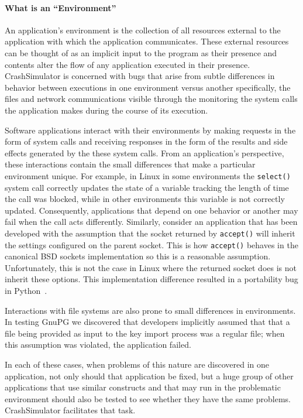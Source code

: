 \paragraph{What is an ``Environment''}

An application's environment is the collection of all resources external to the application with which the
application communicates.  These external resources can be thought of as an implicit input to the program as their
presence and contents alter the flow of any application executed in their presence. CrashSimulator is concerned with
bugs that arise from subtle differences in behavior between executions in one environment versus another
specifically, the files and network communications visible through the monitoring the system calls the application
makes during the course of its execution.

Software applications interact with their environments by making requests in the form of system calls and receiving
responses in the form of the results and side effects generated by the these system calls.  From an application's
perspective, these interactions contain the small differences that make a particular environment unique.  For example,
in Linux in some environments the {\tt select()} system call correctly updates the state of a variable tracking the
length of time the call was blocked, while in other environments this variable is not correctly updated.  Consequently,
applications that depend on one behavior or another may fail when the call acts differently. Similarly, consider an
application that has been developed with the assumption that the socket returned by {\tt accept()} will inherit the
settings configured on the parent socket.  This is how {\tt accept()} behaves in the canonical BSD sockets
implementation so this is a reasonable assumption.  Unfortunately, this is not the case in Linux
where the returned socket does is not inherit these options.  This implementation difference resulted in a portability
bug in Python~\cite{Zhuang_NSDI_2014}.

Interactions with file systems are also prone to small differences in environments.
In testing GnuPG we discovered that developers implicitly assumed that that a file being provided as input to the key
import process was a regular file; when this assumption was violated, the application failed.

In each of these cases, when problems of this nature are discovered in one application, not only should that application
be fixed, but a huge group of other applications that use similar constructs and that may run in the problematic
environment should also be tested to see whether they have the same problems. CrashSimulator facilitates that task.


